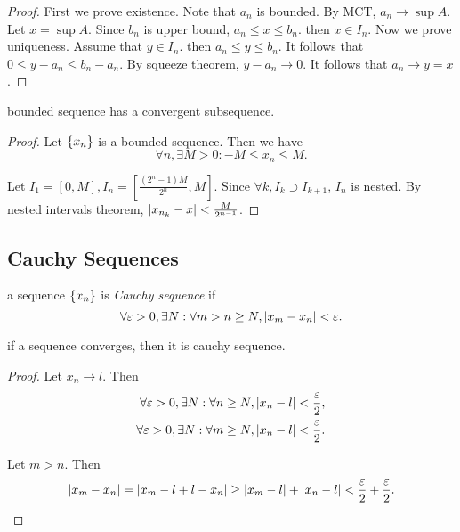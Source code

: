 \begin{proof}
  First we prove existence. Note that $a_n$ is bounded. By MCT, $a_n \to \sup
    A$. Let $x = \sup A$. Since $b_n$ is upper bound, $a_n \le x \le b_n$. then $x
    \in I_n$. Now we prove uniqueness. Assume that $y \in I_n$. then $a_n \le y
    \le b_n$. It follows that $0 \le y - a_n \le b_n - a_n$. By squeeze theorem,
  $y - a_n \to 0$. It follows that $a_n \to y = x$.
\end{proof}

\begin{theorem} 
  bounded sequence has a convergent subsequence.
  \label{thm:nest_bol}
\end{theorem}

\begin{proof}
  Let $\{x_n\}$ is a bounded sequence. Then we have
  \begin{equation}
    \forall n, \exists M > 0: -M \le x_n \le M.
  \end{equation}

  Let $I_1 = [0, M], I_n = [\frac{(2^n - 1)M}{2^n}, M]$. Since $\forall k, I_k
    \supset I_{k + 1}$, $I_n$ is nested. By nested intervals theorem,
  $\left| x_{n_k} - x \right| < \frac{M}{2^{n-1}}$.
\end{proof}


\subsection{Cauchy Sequences}

\begin{definition}
  a sequence $\{x_n\}$ is \emph{Cauchy sequence} if
  \begin{equation}
    \forall \varepsilon > 0, \exists N: \forall m > n \ge N, \left| x_m - x_n \right| < \varepsilon.
  \end{equation}
  \label{def:cauchy}
\end{definition}

\begin{theorem}
  if a sequence converges, then it is cauchy sequence.
  \label{thm:cauchy_conv}
\end{theorem}

\begin{proof}
  Let $x_n \to l$. Then
  \begin{equation}
    \begin{split}
      \forall \varepsilon > 0, \exists N: \forall n \ge N, 
      \left| x_n - l \right| < \frac{\varepsilon}{2}, \\
      \forall \varepsilon > 0, \exists N: \forall m \ge N, 
      \left| x_n - l \right| < \frac{\varepsilon}{2}.
    \end{split}
  \end{equation}

  Let $m > n$. Then
  \begin{equation}
    \left| x_m - x_n \right|
    =   \left| x_m - l + l - x_n \right|
    \ge \left| x_m - l \right| + \left| x_n - l \right|
    <   \frac{\varepsilon}{2} + \frac{\varepsilon}{2}.
  \end{equation}
\end{proof}

